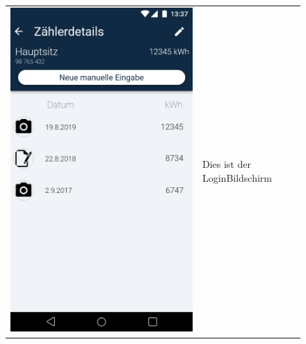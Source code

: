 \begin{figure}[h]
\begin{tabularx}{\textwidth}{X | X}
	\includegraphics[scale = 0.22]{img/AndroidMockup/history} & Dies ist der LoginBildschirm \\
\end{tabularx}
\end{figure}

